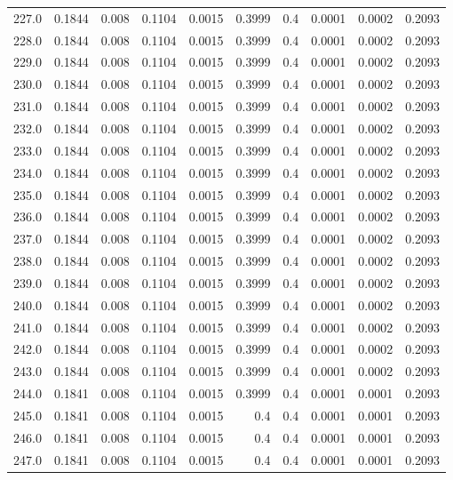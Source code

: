 \begin{longtable}{lrrrrrrrrr}
227.0 & 0.1844 & 0.008 & 0.1104 & 0.0015 & 0.3999 & 0.4 & 0.0001 & 0.0002 & 0.2093 \\
228.0 & 0.1844 & 0.008 & 0.1104 & 0.0015 & 0.3999 & 0.4 & 0.0001 & 0.0002 & 0.2093 \\
229.0 & 0.1844 & 0.008 & 0.1104 & 0.0015 & 0.3999 & 0.4 & 0.0001 & 0.0002 & 0.2093 \\
230.0 & 0.1844 & 0.008 & 0.1104 & 0.0015 & 0.3999 & 0.4 & 0.0001 & 0.0002 & 0.2093 \\
231.0 & 0.1844 & 0.008 & 0.1104 & 0.0015 & 0.3999 & 0.4 & 0.0001 & 0.0002 & 0.2093 \\
232.0 & 0.1844 & 0.008 & 0.1104 & 0.0015 & 0.3999 & 0.4 & 0.0001 & 0.0002 & 0.2093 \\
233.0 & 0.1844 & 0.008 & 0.1104 & 0.0015 & 0.3999 & 0.4 & 0.0001 & 0.0002 & 0.2093 \\
234.0 & 0.1844 & 0.008 & 0.1104 & 0.0015 & 0.3999 & 0.4 & 0.0001 & 0.0002 & 0.2093 \\
235.0 & 0.1844 & 0.008 & 0.1104 & 0.0015 & 0.3999 & 0.4 & 0.0001 & 0.0002 & 0.2093 \\
236.0 & 0.1844 & 0.008 & 0.1104 & 0.0015 & 0.3999 & 0.4 & 0.0001 & 0.0002 & 0.2093 \\
237.0 & 0.1844 & 0.008 & 0.1104 & 0.0015 & 0.3999 & 0.4 & 0.0001 & 0.0002 & 0.2093 \\
238.0 & 0.1844 & 0.008 & 0.1104 & 0.0015 & 0.3999 & 0.4 & 0.0001 & 0.0002 & 0.2093 \\
239.0 & 0.1844 & 0.008 & 0.1104 & 0.0015 & 0.3999 & 0.4 & 0.0001 & 0.0002 & 0.2093 \\
240.0 & 0.1844 & 0.008 & 0.1104 & 0.0015 & 0.3999 & 0.4 & 0.0001 & 0.0002 & 0.2093 \\
241.0 & 0.1844 & 0.008 & 0.1104 & 0.0015 & 0.3999 & 0.4 & 0.0001 & 0.0002 & 0.2093 \\
242.0 & 0.1844 & 0.008 & 0.1104 & 0.0015 & 0.3999 & 0.4 & 0.0001 & 0.0002 & 0.2093 \\
243.0 & 0.1844 & 0.008 & 0.1104 & 0.0015 & 0.3999 & 0.4 & 0.0001 & 0.0002 & 0.2093 \\
244.0 & 0.1841 & 0.008 & 0.1104 & 0.0015 & 0.3999 & 0.4 & 0.0001 & 0.0001 & 0.2093 \\
245.0 & 0.1841 & 0.008 & 0.1104 & 0.0015 & 0.4 & 0.4 & 0.0001 & 0.0001 & 0.2093 \\
246.0 & 0.1841 & 0.008 & 0.1104 & 0.0015 & 0.4 & 0.4 & 0.0001 & 0.0001 & 0.2093 \\
247.0 & 0.1841 & 0.008 & 0.1104 & 0.0015 & 0.4 & 0.4 & 0.0001 & 0.0001 & 0.2093 \\

\end{longtable}
